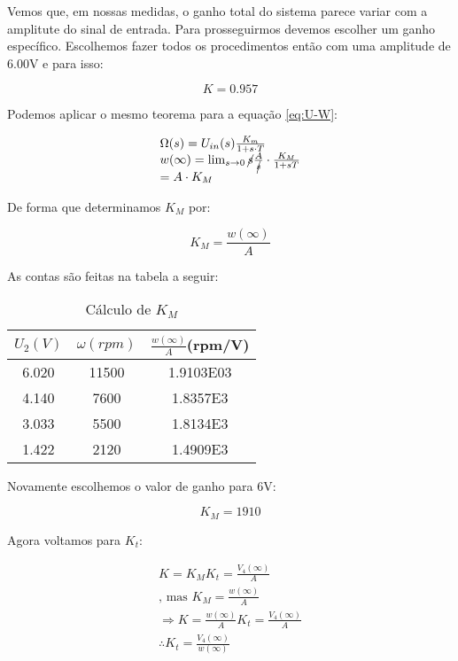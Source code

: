 Vemos que, em nossas medidas, o ganho total do sistema parece variar com a amplitute do sinal de entrada. Para prosseguirmos devemos escolher um ganho específico. Escolhemos fazer todos os procedimentos então com uma amplitude de 6.00V e para isso:

\begin{equation}
\boxed{
	K = 0.957
    }
\end{equation}

Podemos aplicar o mesmo teorema para a equação \ref{eq:U-W}:

\begin{equation}
\begin{array}{l}
\Omega(s) = U_{in}(s)\frac{K_m}{1 + s \cdot T} \\
w(\infty)=\lim_{s \rightarrow 0}\cancel{s}\frac{A}{\cancel{s}}\cdot\frac{K_M}{1+sT} \\
=A\cdot K_M
\end{array}
\end{equation}

De forma que determinamos $K_M$ por:

\begin{equation}
	K_M = \frac{w(\infty)}{A}
\end{equation}

As contas são feitas na tabela a seguir:

\begin{table}[H]
\centering
\begin{tabular}{|c|c|c|}
\hline
$U_2(V)$ & $\omega (rpm)$ & $\frac{w(\infty)}{A}$(rpm/V)\\
\hline
6.020 & 11500 & 1.9103E03\\
\hline
4.140 & 7600 & 1.8357E3\\
\hline
3.033 & 5500 & 1.8134E3\\
\hline
1.422 & 2120 & 1.4909E3\\
\hline
\end{tabular}
\caption{Cálculo de $K_M$}
\label{tab:teste1-analise2}
\end{table}

Novamente escolhemos o valor de ganho para 6V:

\begin{equation}
	\boxed{K_M = 1910}
\end{equation}

Agora voltamos para $K_t$:

\begin{equation}
\begin{array}{l}
	K = K_MK_t = \frac{V_4(\infty)}{A} \\
    \mbox{, mas }K_M = \frac{w(\infty)}{A}\\
    \Rightarrow K = \frac{w(\infty)}{A} K_t = \frac{V_4(\infty)}{A} \\
    \therefore K_t = \frac{V_4(\infty)}{w(\infty)}
\end{array}
\end{equation}

